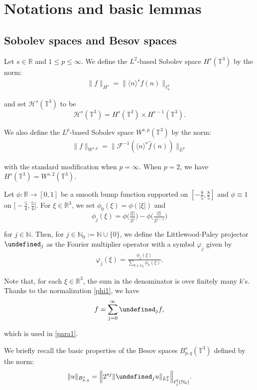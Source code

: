 \documentclass[%
11pt,  reqno]{amsart}
\newcommand{\1}{\hspace{0.2mm}\text{I}\hspace{0.2mm}}
\newcommand{\noi}{\noindent}
\newcommand{\R}{\mathbb{R}}
\newcommand{\T}{\mathbb{T}}
\let\P= \undefined
\newcommand{\P}{\mathbf{P}}
\newcommand{\F}{\mathcal{F}}
\newcommand{\ft}{\widehat}
\renewcommand{\l}{\ell}
\newcommand{\jb}[1]
{\langle #1 \rangle}
\newcommand{\N}{\mathbb{N}}
\renewcommand{\H}{\mathcal{H}}
\numberwithin{equation}{section}
\numberwithin{theorem}{section}
\begin{document}
\section{Notations and basic lemmas}
\label{SEC:2}


\subsection{Sobolev spaces 
 and Besov spaces}


Let $s \in \R$ and $1 \leq p \leq \infty$.
We define the $L^2$-based Sobolev space $H^s(\T^3)$
by the norm:
\begin{align*}
\| f \|_{H^s} = \| \jb{n}^s \ft f (n) \|_{\l^2_n}
\end{align*}

\noi
and set $\H^s(\T^3)$ to be 
\[\H^s(\T^3) = H^s(\T^3)\times H^{s-1}(\T^3).\]


\noi
We also define the $L^p$-based Sobolev space $W^{s, p}(\T^3)$
by the norm:
\begin{align*}
\| f \|_{W^{s, p}} = \big\| \F^{-1} (\jb{n}^s \ft f(n))\big\|_{L^p}
\end{align*}

\noi
with the standard modification when $p = \infty$.
When $p = 2$, we have $H^s(\T^3) = W^{s, 2}(\T^3)$. 



Let $\phi:\R \to [0, 1]$ be a smooth  bump function supported on $[-\frac{8}{5}, \frac{8}{5}]$ 
and $\phi\equiv 1$ on $\big[-\frac 54, \frac 54\big]$.
For $\xi \in \R^3$, we set $\phi_0(\xi) = \phi(|\xi|)$
and 
\[\phi_{j}(\xi) = \phi\big(\tfrac{|\xi|}{2^j}\big)-\phi\big(\tfrac{|\xi|}{2^{j-1}}\big)\]

\noi
for $j \in \N$.
Then, for $j \in \N_0 := \N \cup\{0\}$, 
we define  the Littlewood-Paley projector  $\P_j$ 
as the Fourier multiplier operator with a symbol $\varphi_j$
given by 
\begin{align}
 \varphi_j(\xi) = \frac{\phi_j(\xi)}{\sum_{k \in \N_0} \phi_k(\xi)}.
\label{phi1}
 \end{align}

\noi
Note that, for each $\xi \in \R^3$,  the sum in the denominator is over finitely many $k$'s.
Thanks to the normalization \eqref{phi1}, 
we have 
\[ f = \sum_{j = 0}^\infty \P_j f, \]

\noi
which is used in \eqref{para1}.


We briefly recall the basic properties of the Besov spaces $B^s_{p, q}(\T^3)$
defined by the norm:
\begin{equation*}
\| u \|_{B^s_{p,q}} = \Big\| 2^{s j} \| \P_{j} u \|_{L^p_x} \Big\|_{\l^q_j(\N_0)}.
\end{equation*}
\end{document}
